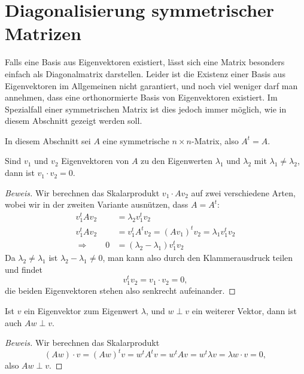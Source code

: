 %
%
%
\section{Diagonalisierung symmetrischer Matrizen\label{section-diag-sym}}
Falls eine Basis aus Eigenvektoren existiert, lässt sich eine Matrix
besonders einfach als Diagonalmatrix darstellen.
Leider ist die Existenz
einer Basis aus Eigenvektoren im Allgemeinen nicht garantiert, und noch
viel weniger darf man annehmen, dass eine orthonormierte Basis
von Eigenvektoren existiert.
Im Spezialfall einer symmetrischen Matrix
ist dies jedoch immer möglich, wie in diesem Abschnitt gezeigt werden
soll.

In diesem Abschnitt sei $A$ eine symmetrische $n\times n$-Matrix,
also  $A^t=A$.

\begin{hilfssatz}
Sind $v_1$ und $v_2$ Eigenvektoren von $A$ zu den Eigenwerten 
$\lambda_1$ und $\lambda_2$ mit $\lambda_1\ne \lambda_2$, dann
ist $v_1\cdot v_2=0$.
\end{hilfssatz}

\begin{proof}[Beweis]
Wir berechnen das Skalarprodukt $v_1\cdot Av_2$ auf zwei verschiedene
Arten, wobei wir in der zweiten Variante ausnützen, dass $A=A^t$:
\begin{align*}
v_1^tAv_2&=\lambda_2v_1^tv_2
\\
v_1^tAv_2&=v_1^tA^tv_2=(Av_1)^tv_2=\lambda_1v_1^tv_2
\\
\Rightarrow
\qquad
0&=(\lambda_2-\lambda_1)v_1^tv_2
\end{align*}
Da $\lambda_2\ne\lambda_1$ ist $\lambda_2-\lambda_1\ne 0$, man kann
also durch den Klammerausdruck teilen und findet
\[
v_1^tv_2=v_1\cdot v_2=0,
\]
die beiden Eigenvektoren stehen also senkrecht aufeinander.
\end{proof}

\begin{hilfssatz}
\label{ev-ortho}
Ist $v$ ein Eigenvektor zum Eigenwert $\lambda$, und $w\perp v$ ein weiterer
Vektor, dann ist auch $Aw\perp v$.
\end{hilfssatz}

\begin{proof}[Beweis]
Wir berechnen das Skalarprodukt
\[
(Aw)\cdot v=(Aw)^t v=w^tA^tv=w^tAv=w^t\lambda v=\lambda w\cdot v=0,
\]
also $Aw\perp v$.
\end{proof}

